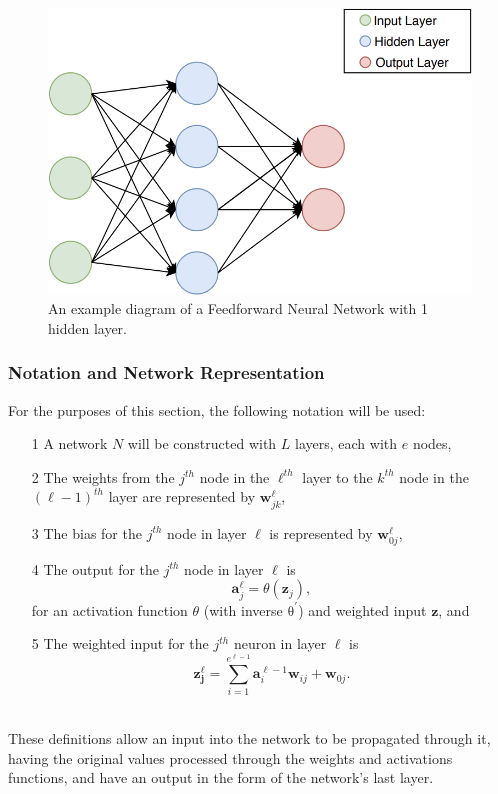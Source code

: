 \documentclass[a4paper,11pt,oneside]{article}
\theoremstyle{plain}
\theoremstyle{definition}
\begin{document}
	\begin{figure}[H]
		\centering 
		\includegraphics[scale=0.5]{images/implementation/neural_network_diagram.png}
		\caption[Feedforward Neural Network Diagram]{An example diagram of a Feedforward Neural Network with 1 hidden layer.}
		\label{figure-neural_network_diagram}
	\end{figure}		
	
	\subsubsection{Notation and Network Representation}\label{imp_ffn_functions}
	
	For the purposes of this section, the following notation will be used:
	
	\begin{itemize}
		\item[1] A network $N$ will be constructed with $L$ layers, each with $e$ nodes,
		\item[2] The weights from the $j^{th}$ node in the $\ell^{th}$ layer to the $k^{th}$ node in the $(\ell-1)^{th}$ layer are represented by $\mathbf{w}^\ell_{jk}$,
		\item[3] The bias for the $j^{th}$ node in layer $\ell$ is represented by $\mathbf{w}^\ell_{0j}$,
		\item[4] The output for the $j^{th}$ node in layer $\ell$ is 
		\begin{equation}\label{eq_activation_output}
		\mathbf{a}^\ell_j = \theta(\mathbf{z}_j) ,
		\end{equation} 
		for an activation function $\theta$ (with inverse $\mathrm{\theta^{\prime}}$) and weighted input $\mathbf{z}$, and
		\item[5] The weighted input for the $j^{th}$ neuron in layer $\ell$ is 
		\begin{equation}\label{eq_weighted_input}
		\mathbf{z^\ell_j}=\sum_{i=1}^{e^{\ell-1}}{\mathbf{a}^{\ell-1}_i\mathbf{w}_{ij}} + \mathbf{w}_{0j} .
		\end{equation}
	\end{itemize}
	~\\
	These definitions allow an input into the network to be propagated through it, having the original values processed through the weights and activations functions, and have an output in the form of the network's last layer.
	
\end{document}
